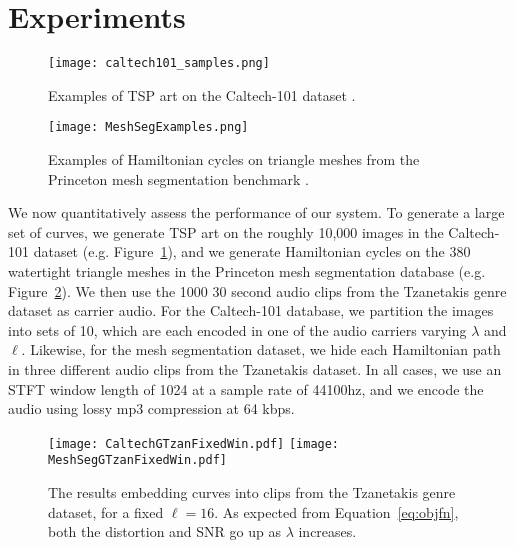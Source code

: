 \documentclass[runningheads]{llncs}
\begin{document}
\section{Experiments}
\label{sec:experiments}



\begin{figure}
  \centering
  \texttt{[image: caltech101\_samples.png]}
  \caption{Examples of TSP art on the Caltech-101 dataset \cite{li_andreeto_ranzato_perona_2022}.}
  \label{fig:caltech101examples}
\end{figure}

\begin{figure}
  \centering
  \texttt{[image: MeshSegExamples.png]}
  \caption{Examples of Hamiltonian cycles on triangle meshes from the Princeton mesh segmentation benchmark \cite{Chen:2009:ABF}.}
  \label{fig:meshsegexamples}
\end{figure}

We now quantitatively assess the performance of our system.  To generate a large set of curves, we generate TSP art on the roughly 10,000 images in the Caltech-101 dataset  \cite{li_andreeto_ranzato_perona_2022} (e.g. Figure~\ref{fig:caltech101examples}), and we generate Hamiltonian cycles on the 380 watertight triangle meshes in the Princeton mesh segmentation database \cite{Chen:2009:ABF} (e.g. Figure~\ref{fig:meshsegexamples}).  We then use the 1000 30 second audio clips from the Tzanetakis genre dataset \cite{tzanetakis2002musical} as carrier audio.  For the Caltech-101 database, we partition the images into sets of 10, which are each encoded in one of the audio carriers varying $\lambda$ and $\ell$.  Likewise, for the mesh segmentation dataset, we hide each Hamiltonian path in three different audio clips from the Tzanetakis dataset.  In all cases, we use an STFT window length of 1024 at a sample rate of 44100hz, and we encode the audio using lossy mp3 compression at 64 kbps.



\begin{figure}
  \centering
  \texttt{[image: CaltechGTzanFixedWin.pdf]}
  \texttt{[image: MeshSegGTzanFixedWin.pdf]}
  \caption{The results embedding curves into clips from the Tzanetakis genre dataset, for a fixed $\ell=16$.  As expected from Equation~\ref{eq:objfn}, both the distortion and SNR go up as $\lambda$ increases.}
  \label{fig:ResultsFixedWin}
\end{figure}
\end{document}
